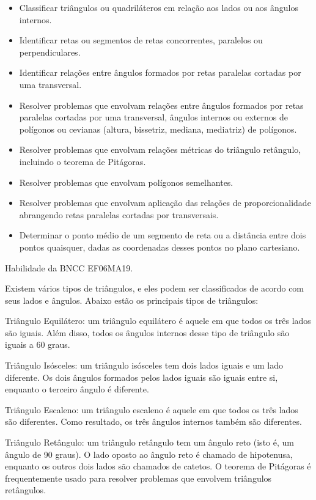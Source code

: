 \begin{itemize}
\item
  Classificar triângulos ou quadriláteros em relação aos lados ou aos
  ângulos internos.
\item
  Identificar retas ou segmentos de retas concorrentes, paralelos ou
  perpendiculares.
\item
  Identificar relações entre ângulos formados por retas paralelas
  cortadas por uma transversal.
\item
  Resolver problemas que envolvam relações entre ângulos formados por
  retas paralelas cortadas por uma transversal, ângulos internos ou
  externos de polígonos ou cevianas (altura, bissetriz, mediana,
  mediatriz) de polígonos.
\item
  Resolver problemas que envolvam relações métricas do triângulo
  retângulo, incluindo o teorema de Pitágoras.
\item
  Resolver problemas que envolvam polígonos semelhantes.
\item
  Resolver problemas que envolvam aplicação das relações de
  proporcionalidade abrangendo retas paralelas cortadas por
  transversais.
\item
  Determinar o ponto médio de um segmento de reta ou a distância entre
  dois pontos quaisquer, dadas as coordenadas desses pontos no plano
  cartesiano.
\end{itemize}

Habilidade da BNCC EF06MA19.

Existem vários tipos de triângulos, e eles podem ser classificados de
acordo com seus lados e ângulos. Abaixo estão os principais tipos de
triângulos:

Triângulo Equilátero: um triângulo equilátero é aquele em que todos os
três lados são iguais. Além disso, todos os ângulos internos desse tipo
de triângulo são iguais a 60 graus.

Triângulo Isósceles: um triângulo isósceles tem dois lados iguais e um
lado diferente. Os dois ângulos formados pelos lados iguais são iguais
entre si, enquanto o terceiro ângulo é diferente.

Triângulo Escaleno: um triângulo escaleno é aquele em que todos os três
lados são diferentes. Como resultado, os três ângulos internos também
são diferentes.

Triângulo Retângulo: um triângulo retângulo tem um ângulo reto (isto é,
um ângulo de 90 graus). O lado oposto ao ângulo reto é chamado de
hipotenusa, enquanto os outros dois lados são chamados de catetos. O
teorema de Pitágoras é frequentemente usado para resolver problemas que
envolvem triângulos retângulos.

